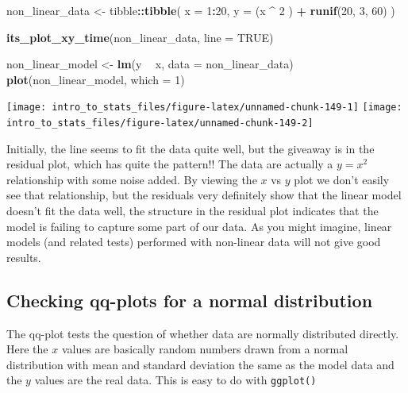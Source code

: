 \documentclass[
]{book}
\newenvironment{Shaded}{\begin{snugshade}}{\end{snugshade}}
\newcommand{\DataTypeTok}[1]{\textcolor[rgb]{0.13,0.29,0.53}{#1}}
\newcommand{\DecValTok}[1]{\textcolor[rgb]{0.00,0.00,0.81}{#1}}
\newcommand{\KeywordTok}[1]{\textcolor[rgb]{0.13,0.29,0.53}{\textbf{#1}}}
\newcommand{\NormalTok}[1]{#1}
\newcommand{\OperatorTok}[1]{\textcolor[rgb]{0.81,0.36,0.00}{\textbf{#1}}}
\newcommand{\OtherTok}[1]{\textcolor[rgb]{0.56,0.35,0.01}{#1}}
\newcommand{\StringTok}[1]{\textcolor[rgb]{0.31,0.60,0.02}{#1}}
\begin{document}
\begin{Shaded}
\begin{Highlighting}[]
\NormalTok{non_linear_data <-}\StringTok{ }\NormalTok{tibble}\OperatorTok{::}\KeywordTok{tibble}\NormalTok{(}
  \DataTypeTok{x =} \DecValTok{1}\OperatorTok{:}\DecValTok{20}\NormalTok{,}
  \DataTypeTok{y =}\NormalTok{ (x }\OperatorTok{^}\StringTok{ }\DecValTok{2}\NormalTok{ ) }\OperatorTok{+}\StringTok{ }\KeywordTok{runif}\NormalTok{(}\DecValTok{20}\NormalTok{, }\DecValTok{3}\NormalTok{, }\DecValTok{60}\NormalTok{)}
\NormalTok{)}

\KeywordTok{its_plot_xy_time}\NormalTok{(non_linear_data, }\DataTypeTok{line =} \OtherTok{TRUE}\NormalTok{)}

\NormalTok{non_linear_model <-}\StringTok{ }\KeywordTok{lm}\NormalTok{(y }\OperatorTok{~}\StringTok{ }\NormalTok{x, }\DataTypeTok{data =}\NormalTok{ non_linear_data)}
\KeywordTok{plot}\NormalTok{(non_linear_model, }\DataTypeTok{which =} \DecValTok{1}\NormalTok{)}
\end{Highlighting}
\end{Shaded}

\texttt{[image: intro\_to\_stats\_files/figure-latex/unnamed-chunk-149-1]} \texttt{[image: intro\_to\_stats\_files/figure-latex/unnamed-chunk-149-2]}

Initially, the line seems to fit the data quite well, but the giveaway is in the residual plot, which has quite the pattern!! The data are actually a \(y = x^2\) relationship with some noise added. By viewing the \(x\) vs \(y\) plot we don't easily see that relationship, but the residuals very definitely show that the linear model doesn't fit the data well, the structure in the residual plot indicates that the model is failing to capture some part of our data. As you might imagine, linear models (and related tests) performed with non-linear data will not give good results.

\hypertarget{checking-qq-plots-for-a-normal-distribution}{%
\subsection{Checking qq-plots for a normal distribution}\label{checking-qq-plots-for-a-normal-distribution}}

The qq-plot tests the question of whether data are normally distributed directly. Here the \(x\) values are basically random numbers drawn from a normal distribution with mean and standard deviation the same as the model data and the \(y\) values are the real data. This is easy to do with \texttt{ggplot()}
\end{document}
